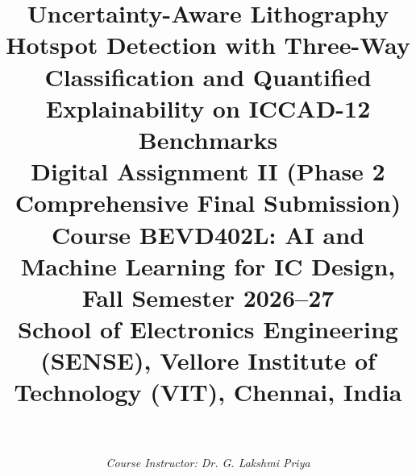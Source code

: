 \documentclass[11pt,journal,onecolumn]{IEEEtran}
\begin{document}
\title{\LARGE \textbf{Uncertainty-Aware Lithography Hotspot Detection with Three-Way Classification and Quantified Explainability on ICCAD-12 Benchmarks}\\[0.5em]
\large Digital Assignment II (Phase 2 Comprehensive Final Submission)\\[0.2em]
\normalsize Course BEVD402L: AI and Machine Learning for IC Design, Fall Semester 2026--27\\
School of Electronics Engineering (SENSE), Vellore Institute of Technology (VIT), Chennai, India
}

\author{
\\[0.3em]
\\
\textit{Course Instructor: Dr. G. Lakshmi Priya}
}

\maketitle
\thispagestyle{plain}
\pagestyle{plain}
\end{document}
